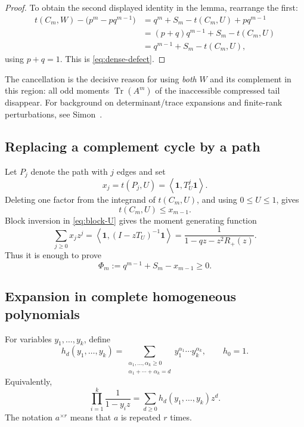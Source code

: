 \documentclass[11pt]{article}
\newcommand{\one}{\mathbf 1}
\newcommand{\ip}[2]{\left\langle #1,#2\right\rangle}
\newcommand{\Tr}{\operatorname{Tr}}
\begin{document}
\begin{proof}
To obtain the second displayed identity in the lemma, rearrange the first:
\begin{align*}
 t(C_m,W)-\bigl(p^m-pq^{m-1}\bigr)
 &=q^m+S_m-t(C_m,U)+pq^{m-1}\\
 &=(p+q)q^{m-1}+S_m-t(C_m,U)\\
 &=q^{m-1}+S_m-t(C_m,U),
\end{align*}
using \(p+q=1\).  This is \eqref{eq:dense-defect}.
\end{proof}

The cancellation is the decisive reason for using \emph{both} \(W\) and its
complement in this region: all odd moments \(\Tr(A^m)\) of the inaccessible
compressed tail disappear.  For background on determinant/trace expansions
and finite-rank perturbations, see Simon~\cite{Simon2005}.

\subsection{Replacing a complement cycle by a path}

Let \(P_j\) denote the path with \(j\) edges and set
\begin{equation}\label{eq:dense-xj}
       x_j=t(P_j,U)=\ip\one{T_U^j\one}.
\end{equation}
Deleting one factor from the integrand of \(t(C_m,U)\), and using \(0\le U\le1\), gives
\begin{equation}\label{eq:dense-cycle-path}
       t(C_m,U)\le x_{m-1}.
\end{equation}
Block inversion in \eqref{eq:block-U} gives the moment generating function
\begin{equation}\label{eq:dense-path-gf}
 \sum_{j\ge0}x_jz^j
 =\ip\one{(I-zT_U)^{-1}\one}
 =\frac1{1-qz-z^2R_+(z)}.
\end{equation}
Thus it is enough to prove
\begin{equation}\label{eq:dense-Phi}
       \Phi_m:=q^{m-1}+S_m-x_{m-1}\ge0.
\end{equation}

\subsection{Expansion in complete homogeneous polynomials}

For variables \(y_1,\ldots,y_k\), define
\[
 h_d(y_1,\ldots,y_k)
 =\sum_{\substack{\alpha_1,\ldots,\alpha_k\ge0\\
                   \alpha_1+\cdots+\alpha_k=d}}
        y_1^{\alpha_1}\cdots y_k^{\alpha_k},
 \qquad h_0=1.
\]
Equivalently,
\begin{equation}\label{eq:dense-h-gf}
       \prod_{i=1}^k\frac1{1-y_i z}
       =\sum_{d\ge0}h_d(y_1,\ldots,y_k)z^d.
\end{equation}
The notation \(a^{\times r}\) means that \(a\) is repeated \(r\) times.
\end{document}
